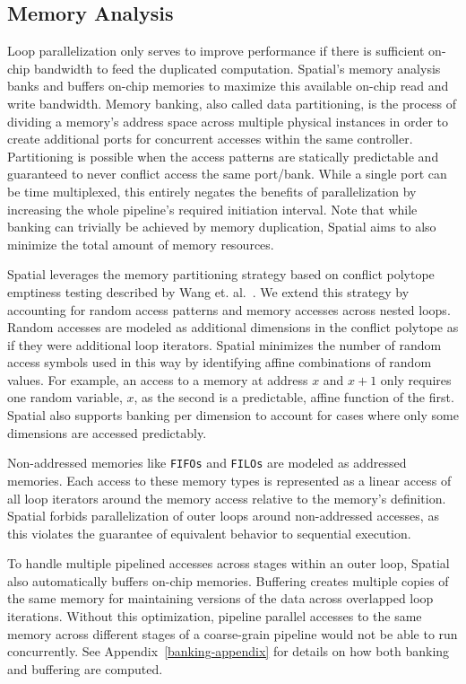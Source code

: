 {\subsection{Memory Analysis}
\label{memopts}

Loop parallelization only serves to improve performance if there is sufficient on-chip bandwidth to feed the duplicated computation.
Spatial's memory analysis banks and buffers on-chip memories to maximize this available on-chip read and write bandwidth.
Memory banking, also called data partitioning, is the process of dividing a memory's address space across multiple physical instances in order to create
additional ports for concurrent accesses within the same controller.
Partitioning is possible when the access patterns are statically predictable and guaranteed to never conflict access the same port/bank.
While a single port can be time multiplexed, this entirely negates the benefits of parallelization by increasing the whole pipeline's required initiation interval.
Note that while banking can trivially be achieved by memory duplication, Spatial aims to also minimize the total amount of memory resources.

Spatial leverages the memory partitioning strategy based on conflict polytope emptiness testing described by Wang et. al.~\cite{Wang_banking}. We extend this strategy by accounting for random access patterns and memory accesses across nested loops. Random accesses are modeled as additional dimensions in the conflict polytope as if they were additional loop iterators. Spatial minimizes the number of random access symbols used in this way by identifying affine combinations of random values. For example, an access to a memory at address $x$ and $x+1$ only requires one random variable, $x$, as the second is a predictable, affine function of the first.
Spatial also supports banking per dimension to account for cases where only some dimensions are accessed predictably.

Non-addressed memories like \texttt{\small{FIFOs}} and \texttt{\small{FILOs}} are modeled as addressed memories.
Each access to these memory types is represented as a linear access of all loop iterators around the memory access relative to the memory's definition. Spatial forbids parallelization of outer loops around non-addressed accesses, as this violates the guarantee of equivalent behavior to sequential execution.

To handle multiple pipelined accesses across stages within an outer loop, Spatial also automatically buffers on-chip memories.
Buffering creates multiple copies of the
same memory for maintaining versions of the data across overlapped loop iterations.
Without this optimization, pipeline parallel accesses to the same memory across different stages of a coarse-grain pipeline would not be able to run concurrently.
See Appendix~\ref{banking-appendix} for details on how both banking and buffering are computed.


}
